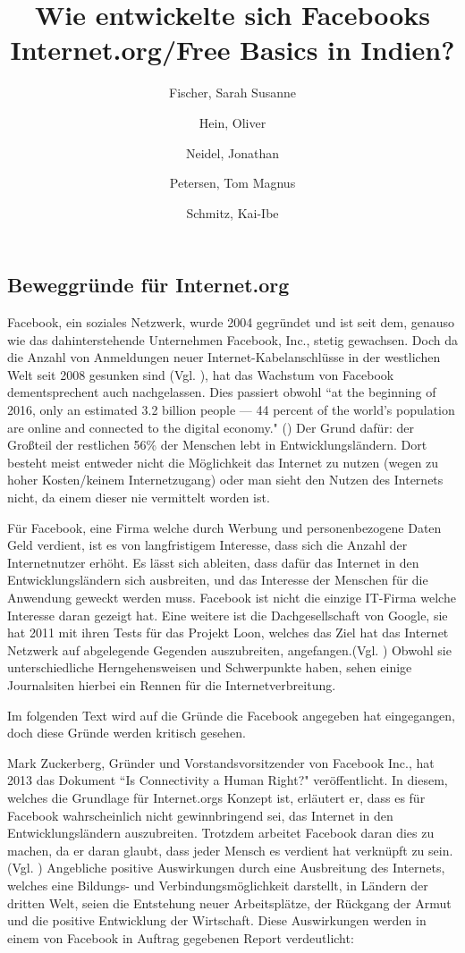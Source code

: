 \documentclass{article}
\title{Wie entwickelte sich Facebooks Internet.org/Free Basics in Indien?}
\author{
  Fischer, Sarah Susanne\\
  \and
  Hein, Oliver\\
  \and
  Neidel, Jonathan\\
  \and
  Petersen, Tom Magnus\\
  \and
  Schmitz, Kai-Ibe\\
}
\begin{document}
\subsection{Beweggründe für Internet.org}
Facebook, ein soziales Netzwerk, wurde 2004 gegründet und ist seit dem, genauso wie das dahinterstehende Unternehmen Facebook, Inc., stetig gewachsen. 
Doch da die Anzahl von Anmeldungen neuer Internet-Kabelanschlüsse in der westlichen Welt seit 2008 gesunken sind
(Vgl. \cite{ICTslowingDown}), hat das Wachstum von Facebook dementsprechent auch nachgelassen.
Dies passiert obwohl ``at the beginning of 2016, only an estimated 3.2 billion people — 44 percent of the world’s population are online and connected to the digital economy." (\cite[7]{connectWorld})
Der Grund dafür: der Großteil der restlichen 56\% der Menschen lebt in Entwicklungsländern. Dort besteht meist entweder nicht die Möglichkeit das Internet zu nutzen (wegen zu hoher Kosten/keinem Internetzugang) oder man sieht den Nutzen des Internets nicht, da einem dieser nie vermittelt worden ist.

\medskip

Für Facebook, eine Firma welche durch Werbung und personenbezogene Daten Geld verdient, ist es von langfristigem Interesse, dass sich die Anzahl der Internetnutzer erhöht.
Es lässt sich ableiten, dass dafür das Internet in den Entwicklungsländern sich ausbreiten, und das Interesse der Menschen für die Anwendung geweckt werden muss.
Facebook ist nicht die einzige IT-Firma welche Interesse daran gezeigt hat.
Eine weitere ist die Dachgesellschaft von Google, sie hat 2011 mit ihren Tests für das Projekt Loon, welches das Ziel hat das Internet Netzwerk auf abgelegende Gegenden auszubreiten, angefangen.(Vgl. \cite{projectLoon})
Obwohl sie unterschiedliche Herngehensweisen und Schwerpunkte haben, sehen einige Journalsiten hierbei ein Rennen für die Internetverbreitung. 

\medskip
    
Im folgenden Text wird auf die Gründe die Facebook angegeben hat eingegangen, doch diese Gründe werden kritisch gesehen.   

\medskip

Mark Zuckerberg, Gründer und Vorstandsvorsitzender von Facebook Inc., hat 2013 das Dokument ``Is Connectivity a Human Right?" veröffentlicht.
In diesem, welches die Grundlage für Internet.orgs Konzept ist, erläutert er, dass es für Facebook wahrscheinlich nicht gewinnbringend sei, das Internet in den Entwicklungsländern auszubreiten. Trotzdem arbeitet Facebook daran dies zu machen, da er daran glaubt, dass jeder Mensch es verdient hat verknüpft zu sein.(Vgl. \cite[1]{HumanRight})
Angebliche positive Auswirkungen durch eine Ausbreitung des Internets, welches eine Bildungs- und Verbindungsmöglichkeit darstellt, in Ländern der dritten Welt, seien die Entstehung neuer Arbeitsplätze, der Rückgang der Armut und die positive Entwicklung der Wirtschaft. Diese Auswirkungen werden in einem von Facebook in Auftrag gegebenen Report verdeutlicht:
                    
\end{document}
